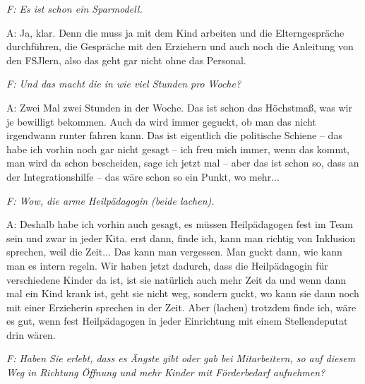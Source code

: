 \begin{linenumbers*}
\emph{F: Es ist schon ein Sparmodell.}

A: Ja, klar.  
Denn die muss ja mit dem Kind arbeiten und die Elterngespräche durchführen, die Gespräche mit den Erziehern und auch noch die Anleitung von den FSJlern, also das geht gar nicht ohne das Personal.

\emph{F: Und das macht die in wie viel Stunden pro Woche?}

A: Zwei Mal zwei Stunden in der Woche. Das ist schon das Höchstmaß, was wir je bewilligt bekommen. Auch da wird immer geguckt, ob man das nicht irgendwann runter fahren kann. Das ist eigentlich die politische Schiene -- das habe ich vorhin noch gar nicht gesagt -- ich freu mich immer, wenn das kommt, man wird da schon bescheiden, sage ich jetzt mal -- aber das ist schon so, dass an der Integrationshilfe -- das wäre schon so ein Punkt, wo mehr...

\emph{F: Wow, die arme Heilpädagogin (beide lachen).}

A: Deshalb habe ich vorhin auch gesagt, es müssen Heilpädagogen fest im Team sein und zwar in jeder Kita. erst dann, finde ich, kann man richtig von Inklusion sprechen, weil die Zeit... Das kann man vergessen. Man guckt dann, wie kann man es intern regeln. Wir haben jetzt dadurch, dass die Heilpädagogin für verschiedene Kinder da ist, ist sie natürlich auch mehr Zeit da und wenn dann mal ein Kind krank ist, geht sie nicht weg, sondern guckt, wo kann sie dann noch mit einer Erzieherin sprechen in der Zeit. Aber (lachen) trotzdem finde ich, wäre es gut, wenn fest Heilpädagogen in jeder Einrichtung mit einem Stellendeputat drin wären. 

\emph{F: Haben Sie erlebt, dass es Ängste gibt oder gab bei Mitarbeitern, so auf diesem Weg in Richtung Öffnung und mehr Kinder mit Förderbedarf aufnehmen?}


\end{linenumbers*}
